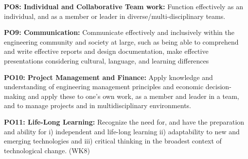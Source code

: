 \begin{titlepage}
	\noindent \textbf{PO8: Individual and Collaborative Team work:} Function effectively as an individual, and as a member or leader in diverse/multi-disciplinary teams.
	
	\noindent \textbf{PO9: Communication:} Communicate effectively and inclusively within the engineering community and society at large, such as being able to comprehend and write effective reports and design documentation, make effective presentations considering cultural, language, and learning differences
	
	\noindent \textbf{PO10: Project Management and Finance:} Apply knowledge and understanding of engineering
	management principles and economic decision-making and apply these to one’s own work, as a member and leader in a team, and to manage projects and in multidisciplinary
	environments.
	
	\noindent \textbf{PO11: Life-Long Learning:} Recognize the need for, and have the preparation and ability for i) independent and life-long learning ii) adaptability to new and emerging technologies and iii) critical thinking in the broadest context of technological change. (WK8)
	
	
	
	
\end{titlepage}



